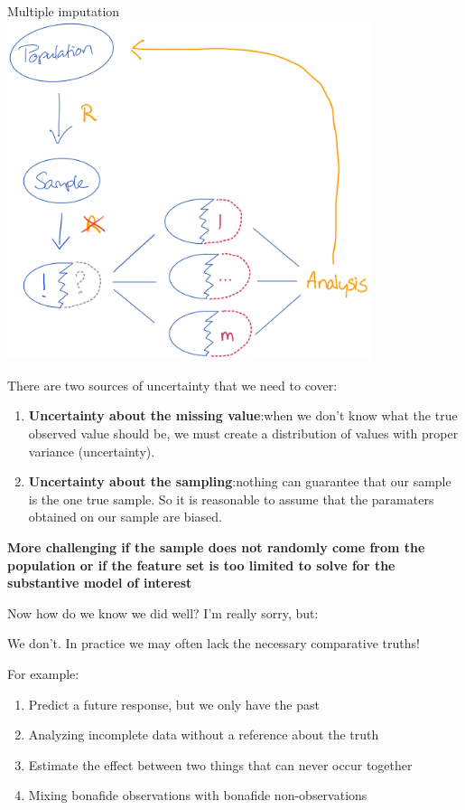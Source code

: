 \documentclass[
  ignorenonframetext,
]{beamer}
\providecommand{\tightlist}{%
  \setlength{\itemsep}{0pt}\setlength{\parskip}{0pt}}\usepackage{longtable,booktabs,array}
\begin{document}
\begin{frame}{Multiple imputation}
\protect\hypertarget{multiple-imputation}{}
\includegraphics[width=0.8\textwidth,height=\textheight]{img/11. missingness_solved.png}

There are two sources of uncertainty that we need to cover:

\begin{enumerate}
\tightlist
\item
  \textbf{Uncertainty about the missing value}:when we don't know what
  the true observed value should be, we must create a distribution of
  values with proper variance (uncertainty).
\item
  \textbf{Uncertainty about the sampling}:nothing can guarantee that our
  sample is the one true sample. So it is reasonable to assume that the
  paramaters obtained on our sample are biased.
\end{enumerate}

\textbf{More challenging if the sample does not randomly come from the
population or if the feature set is too limited to solve for the
substantive model of interest}
\end{frame}

\begin{frame}{Now how do we know we did well?}
\protect\hypertarget{now-how-do-we-know-we-did-well}{}
I'm really sorry, but:

We don't. In practice we may often lack the necessary comparative
truths!

For example:

\begin{enumerate}
\tightlist
\item
  Predict a future response, but we only have the past
\item
  Analyzing incomplete data without a reference about the truth
\item
  Estimate the effect between two things that can never occur together
\item
  Mixing bonafide observations with bonafide non-observations
\end{enumerate}
\end{frame}
\end{document}

